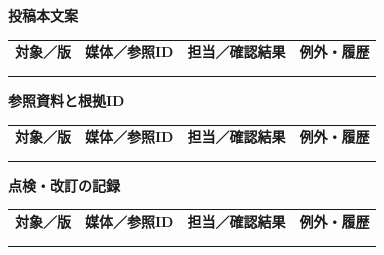 \documentclass[11pt,a4paper]{article}
\begin{document}
\par{}\noindent\textbf{投稿本文案}\par\vspace{1mm}
{\fontsize{8.5}{13}\selectfont
\begin{tabularx}{\linewidth}{@{}XXXX@{}}
\textbf{対象／版} & \textbf{媒体／参照ID} & \textbf{担当／確認結果} & \textbf{例外・履歴}\\[2mm]
\strut & \strut & \strut & \strut\\[5mm]
\strut & \strut & \strut & \strut\\[5mm]
\end{tabularx}
}\vspace{2mm}\par
{}
\par{}\noindent\textbf{参照資料と根拠ID}\par\vspace{1mm}
{\fontsize{8.5}{13}\selectfont
\begin{tabularx}{\linewidth}{@{}XXXX@{}}
\textbf{対象／版} & \textbf{媒体／参照ID} & \textbf{担当／確認結果} & \textbf{例外・履歴}\\[2mm]
\strut & \strut & \strut & \strut\\[5mm]
\strut & \strut & \strut & \strut\\[5mm]
\end{tabularx}
}\vspace{2mm}\par
{}
\par{}\noindent\textbf{点検・改訂の記録}\par\vspace{1mm}
{\fontsize{8.5}{13}\selectfont
\begin{tabularx}{\linewidth}{@{}XXXX@{}}
\textbf{対象／版} & \textbf{媒体／参照ID} & \textbf{担当／確認結果} & \textbf{例外・履歴}\\[2mm]
\strut & \strut & \strut & \strut\\[5mm]
\strut & \strut & \strut & \strut\\[5mm]
\end{tabularx}
}\vspace{2mm}\par
\end{document}

